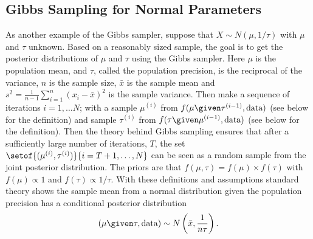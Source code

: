 \documentclass[12pt]{article}
\begin{document}
\subsection*{Gibbs Sampling for Normal Parameters}

As another example of the Gibbs sampler, suppose that \( X \sim N(\mu,
1/\tau) \) with \( \mu \) and \( \tau \) unknown.  Based on a reasonably
sized sample, the goal is to get the posterior distributions of \( \mu \)
and \( \tau \) using the Gibbs sampler.  Here \( \mu \) is the
population mean, and \( \tau \), called the population precision, is the
reciprocal of the variance, \( n \) is the sample size, \( \bar{x} \) is
the sample mean and \( s^2 = \frac{1}{n-1} \sum\limits_{i=1}^n (x_i -
\bar{x})^2 \) is the sample variance.  Then make a sequence of
iterations \( i = 1, \dots N \); with a sample \( \mu^{(i)} \) from \( f
(\mu \given \tau^{(i-1)}, \text{data}) \) (see below for the definition)
and sample \( \tau^{(i)} \) from \( f(\tau \given \mu^{(i-1)}, \text{data})
\) (see below for the definition).  Then the theory behind Gibbs
sampling ensures that after a sufficiently large number of iterations, \(
T \), the set \( \setof{(\mu^{(i)}, \tau^{(i)})}{i = T+1, \dots, N} \)
can be seen as a random sample from the joint posterior distribution.
The priors are that \( f(\mu, \tau) = f(\mu) \times f(\tau) \) with \( f
(\mu) \propto 1 \) and \( f(\tau) \propto 1/\tau \).  With these
definitions and assumptions standard theory shows the sample mean from a
normal distribution given the population precision has a conditional
posterior distribution
\[
    (\mu \given \tau, \text{data}) \sim N\left(\bar{x}, \frac{1}
    {n \tau} \right).
\]
\end{document}
